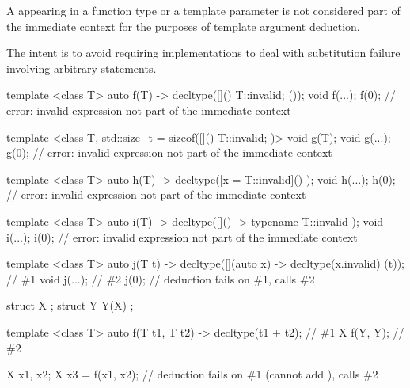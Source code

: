 \pnum
A  appearing in a function type
or a template parameter is not considered part of the immediate context
for the purposes of template argument deduction.
\begin{note}
The intent is to avoid requiring implementations to deal with
substitution failure involving arbitrary statements.
\begin{example}
\begin{codeblock}
template <class T>
  auto f(T) -> decltype([]() { T::invalid; } ());
void f(...);
f(0);               // error: invalid expression not part of the immediate context

template <class T, std::size_t = sizeof([]() { T::invalid; })>
  void g(T);
void g(...);
g(0);               // error: invalid expression not part of the immediate context

template <class T>
  auto h(T) -> decltype([x = T::invalid]() { });
void h(...);
h(0);               // error: invalid expression not part of the immediate context

template <class T>
  auto i(T) -> decltype([]() -> typename T::invalid { });
void i(...);
i(0);               // error: invalid expression not part of the immediate context

template <class T>
  auto j(T t) -> decltype([](auto x) -> decltype(x.invalid) { } (t));   // \#1
void j(...);                                                            // \#2
j(0);               // deduction fails on \#1, calls \#2
\end{codeblock}
\end{example}
\end{note}

\pnum
\begin{example}
\begin{codeblock}
struct X { };
struct Y {
  Y(X){}
};

template <class T> auto f(T t1, T t2) -> decltype(t1 + t2);     // \#1
X f(Y, Y);                                                      // \#2

X x1, x2;
X x3 = f(x1, x2);   // deduction fails on \#1 (cannot add ), calls \#2
\end{codeblock}
\end{example}

